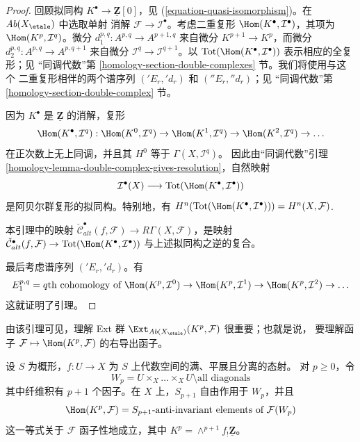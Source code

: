 \begin{proof}
回顾拟同构 $K^\bullet \to \underline{\mathbf{Z}}[0]$，见
(\ref{equation-quasi-isomorphism})。在 $\textit{Ab}(X_\etale)$ 中选取单射
消解 $\mathcal{F} \to \mathcal{I}^\bullet$。考虑二重复形
$\Hom(K^\bullet, \mathcal{I}^\bullet)$，其项为
$\Hom(K^p, \mathcal{I}^q)$。微分
$d_1^{p, q} : A^{p, q} \to A^{p + 1, q}$
来自微分 $K^{p + 1} \to K^p$，而微分
$d_2^{p, q} : A^{p, q} \to A^{p, q + 1}$ 来自微分
$\mathcal{I}^q \to \mathcal{I}^{q + 1}$。以
$\text{Tot}(\Hom(K^\bullet, \mathcal{I}^\bullet))$ 表示相应的全复形；见
“同调代数”第 \ref{homology-section-double-complexes} 节。我们将使用与这个
二重复形相伴的两个谱序列 $({}'E_r, {}'d_r)$ 和 $({}''E_r, {}''d_r)$；见
“同调代数”第 \ref{homology-section-double-complex} 节。

\medskip\noindent
因为 $K^\bullet$ 是 $\underline{\mathbf{Z}}$ 的消解，复形
$$
\Hom(K^\bullet, \mathcal{I}^q) :
\Hom(K^0, \mathcal{I}^q) \to
\Hom(K^1, \mathcal{I}^q) \to
\Hom(K^2, \mathcal{I}^q) \to \ldots
$$
在正次数上无上同调，并且其 $H^0$ 等于 $\Gamma(X, \mathcal{I}^q)$。
因此由“同调代数”引理
\ref{homology-lemma-double-complex-gives-resolution}，自然映射
$$
\mathcal{I}^\bullet(X) \longrightarrow
\text{Tot}(\Hom(K^\bullet, \mathcal{I}^\bullet))
$$
是阿贝尔群复形的拟同构。特别地，有
$H^n(\text{Tot}(\Hom(K^\bullet, \mathcal{I}^\bullet))) = H^n(X, \mathcal{F})$.

\medskip\noindent
本引理中的映射 $\check{\mathcal{C}}^\bullet_{alt}(f, \mathcal{F}) \to
R\Gamma(X, \mathcal{F})$，是映射
$\check{\mathcal{C}}^\bullet_{alt}(f, \mathcal{F}) \to
\text{Tot}(\Hom(K^\bullet, \mathcal{I}^\bullet))$ 与上述拟同构之逆的复合。

\medskip\noindent
最后考虑谱序列 $({}'E_r, {}'d_r)$。有
$$
E_1^{p, q} = q\text{th cohomology of }
\Hom(K^p, \mathcal{I}^0) \to
\Hom(K^p, \mathcal{I}^1) \to
\Hom(K^p, \mathcal{I}^2) \to \ldots
$$
这就证明了引理。
\end{proof}

\noindent
由该引理可见，理解 Ext 群
$\Ext_{\textit{Ab}(X_\etale)}(K^p, \mathcal{F})$ 很重要；也就是说，
要理解函子 $\mathcal{F} \mapsto \Hom(K^p, \mathcal{F})$ 的右导出函子。

\begin{lemma}
\label{lemma-compute}
设 $S$ 为概形，$f : U \to X$ 为 $S$ 上代数空间的满、平展且分离的态射。
对 $p \geq 0$，令
$$
W_p = U \times_X \ldots \times_X U \setminus \text{all diagonals}
$$
其中纤维积有 $p + 1$ 个因子。在 $X$ 上，$S_{p + 1}$ 自由作用于 $W_p$，并且
$$
\Hom(K^p, \mathcal{F}) = S_{p + 1}\text{-anti-invariant elements of }
\mathcal{F}(W_p)
$$
这一等式关于 $\mathcal{F}$ 函子性地成立，其中
$K^p = \wedge^{p + 1}f_!\underline{\mathbf{Z}}$。
\end{lemma}

